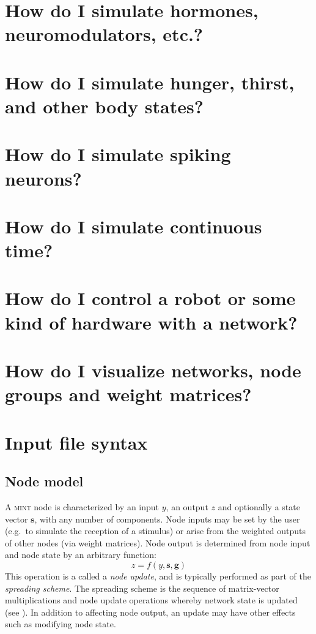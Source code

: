\documentclass[11pt,letterpaper]{memoir}
\let\fref\relax%
\newcommand{\mint}{{\scshape\sffamily mint}\xspace}
\renewcommand{\vec}[1]{\ensuremath{\mathbf#1}\xspace}
\begin{document}
\section{How do I simulate hormones, neuromodulators, etc.?}
\label{sec:hormones-etc}

\section{How do I simulate  hunger, thirst, and other body states?}
\label{sec:body-states}

\section{How do I simulate spiking neurons?}
\label{sec:spiking}

\section{How do I simulate continuous time?}
\label{sec:continuous-time}

\section{How do I control a robot or some kind of hardware with a network?}
\label{sec:hardware-control}

\section{How do I visualize networks, node groups and weight
  matrices?}
\label{sec:network-analysis}

\section{Input file syntax}

\subsection{Node model}
\label{sec:nodemodel}
A \mint node is characterized by an input $y$, an output $z$ and
optionally a state vector $\vec s$, with any number of components.
Node inputs may be set by the user (e.g.\ to simulate the reception of
a stimulus) or arise from the weighted outputs of other nodes (via
weight matrices). Node output is determined from node input and node
state by an arbitrary function:
\begin{equation}
  \label{eq:node-model}
  z = f( y, \vec s, \vec g )
\end{equation}
This operation is a called a \textit{node update}, and is typically
performed as part of the \textit{spreading scheme}. The spreading
scheme is the sequence of matrix-vector multiplications and node
update operations whereby network state is updated (see
\fref{sec:spreading}). In addition to affecting node output, an update
may have other effects such as modifying node state.
\end{document}
